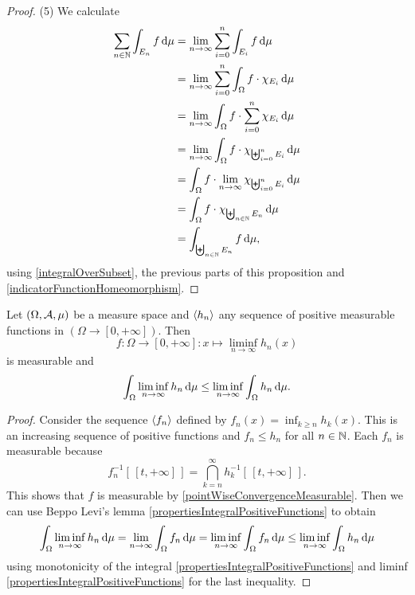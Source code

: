 \begin{proof}
(5) We calculate
\begin{align*}
\sum_{n\in \N}\int_{E_n}f\diff{\mu} &= \lim_{n\to \infty} \sum_{i=0}^n \int_{E_i}f \diff{\mu} \\
&= \lim_{n\to \infty} \sum_{i=0}^n \int_{\Omega}f\cdot\charFunc{E_i} \diff{\mu} \\
&= \lim_{n\to \infty} \int_{\Omega}f\cdot \sum_{i=0}^n\charFunc{E_i} \diff{\mu} \\
&= \lim_{n\to \infty} \int_{\Omega}f\cdot \charFunc{\biguplus_{i=0}^nE_i} \diff{\mu} \\
&= \int_{\Omega}f\cdot \lim_{n\to \infty}\charFunc{\biguplus_{i=0}^nE_i} \diff{\mu} \\
&= \int_{\Omega}f\cdot \charFunc{\biguplus_{n\in \N}E_n} \diff{\mu} \\
&= \int_{\biguplus_{n\in \N}E_n}f \diff{\mu},
\end{align*}
using \ref{integralOverSubset}, the previous parts of this proposition and \ref{indicatorFunctionHomeomorphism}.
\end{proof}

\begin{proposition} \label{FatouLemma}
Let $\sSet{\Omega, \mathcal{A}, \mu}$ be a measure space and $\left\langle h_n \right\rangle$ any sequence of positive measurable functions in $(\Omega\to[0,+\infty])$. Then
\[ f: \Omega\to[0,+\infty]: x\mapsto \liminf_{n\to\infty}h_n(x) \]
is measurable and
\[ \int_\Omega \liminf_{n\to\infty}h_n\operatorname{d \!}{\mu} \leq \liminf_{n\to\infty}\int_\Omega h_n\operatorname{d \!}{\mu}. \]
\end{proposition}
\begin{proof}
Consider the sequence $\left\langle f_n \right\rangle$ defined by $f_n(x) = \inf_{k\geq n}h_k(x)$. This is an increasing sequence of positive functions and $f_n \leq h_n$ for all $n\in\mathbb{N}$. Each $f_n$ is measurable because
\[ f_n^{-1}[\,[t,+\infty]\,] = \bigcap_{k=n}^\infty h_k^{-1}[\,[t,+\infty]\,]. \]
This shows that $f$ is measurable by \ref{pointWiseConvergenceMeasurable}. Then we can use Beppo Levi's lemma \ref{propertiesIntegralPositiveFunctions} to obtain
\[ \int_\Omega\liminf_{n\to\infty}h_n\operatorname{d \!}{\mu} = \lim_{n\to\infty}\int_\Omega f_n\operatorname{d \!}{\mu} = \liminf_{n\to\infty}\int_\Omega f_n\operatorname{d \!}{\mu} \leq \liminf_{n\to\infty}\int_\Omega h_n\operatorname{d \!}{\mu} \]
using monotonicity of the integral \ref{propertiesIntegralPositiveFunctions} and liminf \ref{propertiesIntegralPositiveFunctions} for the last inequality.
\end{proof}

